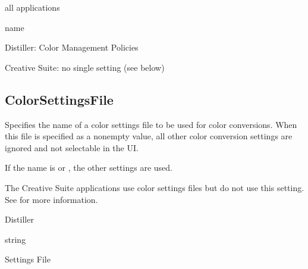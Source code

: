 \documentclass[letterpaper,12pt,english,openany,oneside]{sphinxmanual}
\begin{document}
all applications

\label{\detokenize{PDF_Create_CommonSettings:type-76}}

name

\label{\detokenize{PDF_Create_CommonSettings:ui-name-63}}

Distiller: Color Management Policies

Creative Suite: no single setting (see below)

\label{\detokenize{PDF_Create_CommonSettings:default-value-71}}

\begin{sphinxVerbatim}[commandchars=\\\{\}]
\end{sphinxVerbatim}




\subsection{ColorSettingsFile}
\label{\detokenize{PDF_Create_CommonSettings:colorsettingsfile}}
Specifies the name of a color settings file to be used for color conversions. When this file is specified as a non\sphinxhyphen{}empty value, all other color conversion settings are ignored and not selectable in the UI.

If the name is  or \sphinxcode{\sphinxupquote{()}} , the other settings are used.

The Creative Suite applications use color settings files but do not use this setting. See  for more information.

\label{\detokenize{PDF_Create_CommonSettings:supported-by-78}}

Distiller

\label{\detokenize{PDF_Create_CommonSettings:type-77}}

string

\label{\detokenize{PDF_Create_CommonSettings:ui-name-64}}

Settings File

\label{\detokenize{PDF_Create_CommonSettings:default-value-72}}
\end{document}
